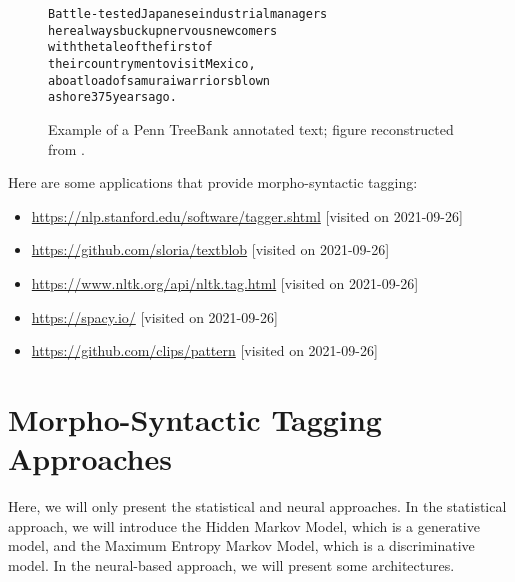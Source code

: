 \documentclass{KBook}
\begin{document}
\begin{figure}[ht]
	\centering
	\begin{tcolorbox}[colback=white, colframe=blue, boxrule=1pt, text width=.62\textwidth]
		\footnotesize
		\begin{alltt}
			Battle-tested Japanese industrial managers
			here always buck up nervous newcomers
			with the tale of the first of
			their countrymen to visit Mexico ,\keyword{/,}
			a boatload of samurai warriors blown
			ashore 375 years ago .
		\end{alltt}
	\end{tcolorbox}
	\caption[Example of a Penn TreeBank annotated text.]{Example of a Penn TreeBank annotated text; figure reconstructed from \cite{2003-taylor}.}
	\label{fig:penn-exp}
\end{figure}

Here are some applications that provide morpho-syntactic tagging:
\begin{itemize}
	\item \url{https://nlp.stanford.edu/software/tagger.shtml} [visited on 2021-09-26]
	\item \url{https://github.com/sloria/textblob} [visited on 2021-09-26]
	\item \url{https://www.nltk.org/api/nltk.tag.html} [visited on 2021-09-26]
	\item \url{https://spacy.io/} [visited on 2021-09-26]
	\item \url{https://github.com/clips/pattern} [visited on 2021-09-26]
\end{itemize}


\section{Morpho-Syntactic Tagging Approaches}

Here, we will only present the statistical and neural approaches. In the statistical approach, we will introduce the Hidden Markov Model, which is a generative model, and the Maximum Entropy Markov Model, which is a discriminative model. In the neural-based approach, we will present some architectures.
\end{document}
